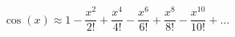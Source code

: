 \documentclass[pdflatex,compress]{beamer}
\begin{document}
	\begin{frame}
		\[ \cos(x) \approx 1 - \frac{x^2}{2!} + \frac{x^4}{4!} - \frac{x^6}{6!} + \frac{x^8}{8!} - \frac{x^{10}}{10!} + \dots \]
	\end{frame}
\end{document}

